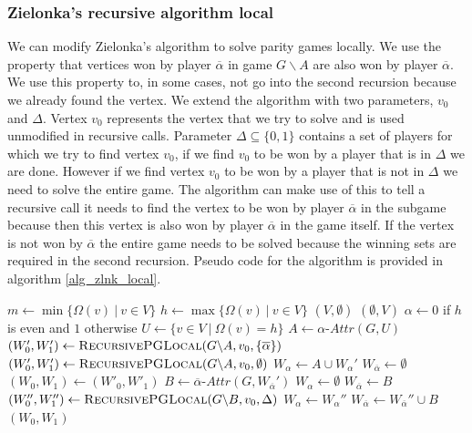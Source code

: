 \subsubsection{Zielonka's recursive algorithm local}
\label{sec:zlnk_org_local}
We can modify Zielonka's algorithm to solve parity games locally. We use the property that vertices won by player $\overline{\alpha}$ in game $G \backslash A$ are also won by player $\overline{\alpha}$. We use this property to, in some cases, not go into the second recursion because we already found the vertex. We extend the algorithm with two parameters, $v_0$ and $\Delta$. Vertex $v_0$ represents the vertex that we try to solve and is used unmodified in recursive calls. Parameter $\Delta \subseteq \{0,1\}$ contains a set of players for which we try to find vertex $v_0$, if we find $v_0$ to be won by a player that is in $\Delta$ we are done. However if we find vertex $v_0$ to be won by a player that is not in $\Delta$ we need to solve the entire game. The algorithm can make use of this to tell a recursive call it needs to find the vertex to be won by player $\overline{\alpha}$ in the subgame because then this vertex is also won by player $\overline{\alpha}$ in the game itself. If the vertex is not won by $\overline{\alpha}$ the entire game needs to be solved because the winning sets are required in the second recursion. Pseudo code for the algorithm is provided in algorithm \ref{alg_zlnk_local}.
\begin{algorithm}
	\caption{$\textsc{RecursivePGLocal}(\textit{PG } G = (V,V_0,V_1, E, \Omega),v_0,\Delta)$}
	\label{alg_zlnk_local}
	\begin{algorithmic}[1]
		\State $m \gets \min\{ \Omega(v)\ |\ v \in V\}$
		\State $h \gets\max\{ \Omega(v)\ |\ v \in V\}$
		\State \Return $(V,\emptyset)$
		\Else
		\State \Return $(\emptyset, V)$
		\EndIf
		\EndIf
		\State $\alpha \gets 0$ if $h$ is even and $1$ otherwise
		\State $U \gets \{v \in V\ |\ \Omega(v) = h\}$
		\State $A \gets \alpha\textit{-Attr}(G, U)$
		\If{$\overline{\alpha} \in \Delta$}
		\State $(W_0', W_1') \gets \textsc{RecursivePGLocal}(G \backslash A,v_0,\{\overline{\alpha}\})$
		\Else
		\State $(W_0', W_1') \gets \textsc{RecursivePGLocal}(G \backslash A,v_0,\emptyset)$
		\EndIf
		\State $W_\alpha \gets A \cup W_\alpha'$
		\State $W_{\overline{\alpha}} \gets \emptyset$
		\Else
		\State $(W_0,W_1) \gets (W'_0, W'_1)$
		\Else
		\State $B \gets \overline{\alpha}\textit{-Attr}(G,W_{\overline{\alpha}}')$
		\State $W_\alpha \gets \emptyset$
		\State $W_{\overline{\alpha}} \gets B$
		\Else
		\State $(W_0'', W_1'') \gets \textsc{RecursivePGLocal}(G \backslash B,v_0,\Delta)$
		\State $W_\alpha \gets W_\alpha''$
		\State $W_{\overline{\alpha}} \gets W_{\overline{\alpha}}'' \cup B$
		\EndIf
		\EndIf
		\EndIf
		\State \Return $(W_0, W_1)$
	\end{algorithmic}
\end{algorithm}
